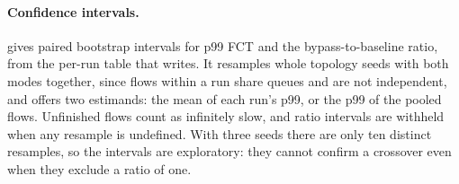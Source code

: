 \paragraph{Confidence intervals.}  gives paired bootstrap intervals for p99 FCT and the bypass-to-baseline ratio, from the per-run table that  writes. It resamples whole topology seeds with both modes together, since flows within a run share queues and are not independent, and offers two estimands: the mean of each run's p99, or the p99 of the pooled flows. Unfinished flows count as infinitely slow, and ratio intervals are withheld when any resample is undefined. With three seeds there are only ten distinct resamples, so the intervals are exploratory: they cannot confirm a crossover even when they exclude a ratio of one.
